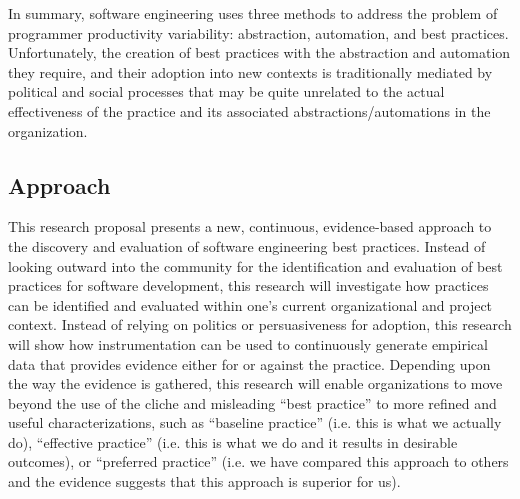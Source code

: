 In summary, software engineering uses three methods to address the problem
of programmer productivity variability: abstraction, automation, and best
practices.  Unfortunately, the creation of best practices with the
abstraction and automation they require, and their adoption into new
contexts is traditionally mediated by political and social processes that
may be quite unrelated to the actual effectiveness of the practice and its
associated abstractions/automations in the organization.


\subsection{Approach}

This research proposal presents a new, continuous, evidence-based approach
to the discovery and evaluation of software engineering best practices.
Instead of looking outward into the community for the identification and
evaluation of best practices for software development, this research will
investigate how practices can be identified and evaluated within one's
current organizational and project context.  Instead of relying on politics
or persuasiveness for adoption, this research will show how instrumentation
can be used to continuously generate empirical data that provides evidence
either for or against the practice.  Depending upon the way the evidence is
gathered, this research will enable organizations to move beyond the use of
the cliche and misleading ``best practice'' to more refined and useful
characterizations, such as ``baseline practice'' (i.e. this is what we
actually do), ``effective practice'' (i.e. this is what we do and it
results in desirable outcomes), or ``preferred practice'' (i.e. we have
compared this approach to others and the evidence suggests that this
approach is superior for us).


